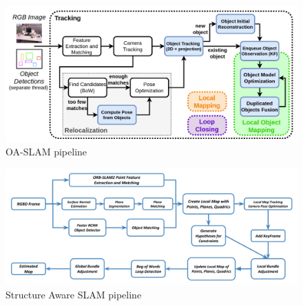 \documentclass[report.tex]{subfiles}
\begin{document}
\begin{figure}[H]
\centering
\includegraphics[scale=0.3] {Images/oa_slam.png}
\caption{\centering OA-SLAM pipeline \cite{oaslam}}
\label{fig:oa_slam.png}
\end{figure}

\begin{figure}[H]
\centering
\includegraphics[scale=0.3] {Images/structure_aware_slam.png}
\caption{\centering Structure Aware SLAM pipeline \cite{StructureAS}}
\label{fig:structure_aware_slam.png}
\end{figure}
    
\end{document}
